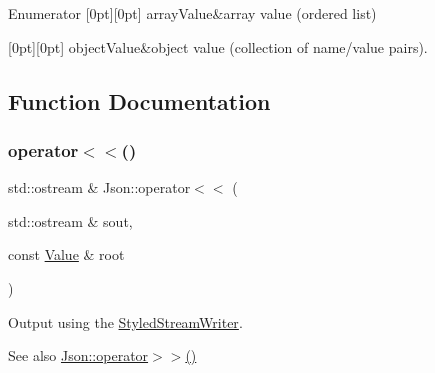 \begin{DoxyEnumFields}{Enumerator}
[0pt][0pt]{}\mbox{\label{namespace_json_a7d654b75c16a57007925868e38212b4eadc8f264f36b55b063c78126b335415f4}} 
array\+Value&array value (ordered list) \\
\hline

[0pt][0pt]{}\mbox{\label{namespace_json_a7d654b75c16a57007925868e38212b4eae8386dcfc36d1ae897745f7b4f77a1f6}} 
object\+Value&object value (collection of name/value pairs). \\
\hline

\end{DoxyEnumFields}


\subsection{Function Documentation}
\mbox{\label{namespace_json_a87bc83d7e90fc666d28aa16727deda2f}} 
\subsubsection{\texorpdfstring{operator$<$$<$()}{operator<<()}}
{\footnotesize\ttfamily std\+::ostream \& Json\+::operator$<$$<$ (\begin{DoxyParamCaption}\item[{std\+::ostream \&}]{sout,  }\item[{const \hyperlink{class_json_1_1_value}{Value} \&}]{root }\end{DoxyParamCaption})}



Output using the \hyperlink{class_json_1_1_styled_stream_writer}{Styled\+Stream\+Writer}. 

\begin{DoxySeeAlso}{See also}
\hyperlink{namespace_json_a4d245ef719cc0853e8e78eb5f99c16e5}{Json\+::operator$>$$>$()} 
\end{DoxySeeAlso}
\mbox{\label{namespace_json_a4d245ef719cc0853e8e78eb5f99c16e5}} 
